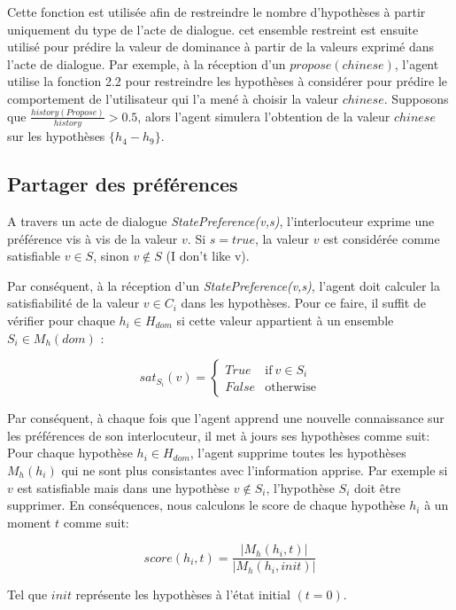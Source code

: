 	Cette fonction est utilisée afin de restreindre le nombre d'hypothèses à partir uniquement du type de l'acte de dialogue. cet ensemble restreint est ensuite utilisé pour prédire la valeur de dominance à partir de la valeurs exprimé dans l'acte de dialogue. Par exemple, à la réception d'un $propose(chinese)$, l'agent utilise la fonction 2.2 pour restreindre les hypothèses à considérer pour prédire le comportement de l'utilisateur qui l'a mené à choisir la valeur $chinese$. Supposons que $\frac{history(Propose)}{history} > 0.5$, alors l'agent simulera l'obtention de la valeur $chinese$ sur les hypothèses $\{h_4 - h_9\}$.
	
	
	\subsection{Partager des préférences}
		A travers un acte de dialogue \emph{StatePreference(v,s)}, l'interlocuteur exprime une préférence vis à vis de la valeur $v$. Si $s =true$, la valeur $v$ est considérée comme satisfiable $v \in S$, sinon $v \not \in S$ (I don't like v). 
		
		Par conséquent, à la réception d'un \emph{StatePreference(v,s)}, l'agent doit calculer la satisfiabilité de la valeur  $v \in C_i$ dans les hypothèses. Pour ce faire, il suffit de vérifier pour chaque $h_i \in H_{dom}$ si cette valeur appartient à un ensemble $S_i \in M_h(dom)$ :
		
				\begin{equation}
				sat_{S_i}(v)= \left\{\begin{array}{ll}
				True	 & \mathrm{if\ }  v \in S_i\\
				False & \mathrm{otherwise}
				\end{array}\right.
				\end{equation}
				
		Par conséquent, à chaque fois que l'agent apprend une nouvelle connaissance sur les préférences de son interlocuteur, il met à jours ses hypothèses  comme suit: 
			Pour chaque hypothèse $h_i \in H_{dom}$, l'agent supprime toutes les hypothèses $M_h(h_i)$ qui ne sont plus consistantes avec l'information apprise. Par exemple si $v$ est satisfiable mais dans une hypothèse $v \not \in S_i$, l'hypothèse $S_i$ doit être supprimer.
			 En conséquences, nous calculons le score de chaque hypothèse $h_i$ à un moment $t$ comme suit: 
			
			$$score(h_i,t) = \frac{|M_h(h_i, t)|}{|M_h(h_i, init)|}$$
			
			Tel que $init$ représente les hypothèses à l'état initial $(t=0)$.
		
